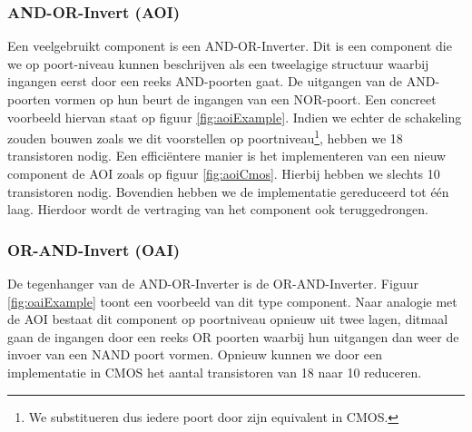 \subsubsection{AND-OR-Invert (AOI)}
Een veelgebruikt component is een AND-OR-Inverter. Dit is een component die we op poort-niveau kunnen beschrijven als een tweelagige structuur waarbij ingangen eerst door een reeks AND-poorten gaat. De uitgangen van de AND-poorten vormen op hun beurt de ingangen van een NOR-poort. Een concreet voorbeeld hiervan staat op figuur \ref{fig:aoiExample}. Indien we echter de schakeling zouden bouwen zoals we dit voorstellen op poortniveau\footnote{We substitueren dus iedere poort door zijn equivalent in CMOS.}, hebben we 18 transistoren nodig. Een effici\"entere manier is het implementeren van een nieuw component de AOI zoals op figuur \ref{fig:aoiCmos}. Hierbij hebben we slechts 10 transistoren nodig. Bovendien hebben we de implementatie gereduceerd tot \'e\'en laag. Hierdoor wordt de vertraging van het component ook teruggedrongen.
\subsubsection{OR-AND-Invert (OAI)}
De tegenhanger van de AND-OR-Inverter is de OR-AND-Inverter. Figuur \ref{fig:oaiExample} toont een voorbeeld van dit type component. Naar analogie met de AOI bestaat dit component op poortniveau opnieuw uit twee lagen, ditmaal gaan de ingangen door een reeks OR poorten waarbij hun uitgangen dan weer de invoer van een NAND poort vormen. Opnieuw kunnen we door een implementatie in CMOS het aantal transistoren van 18 naar 10 reduceren.
